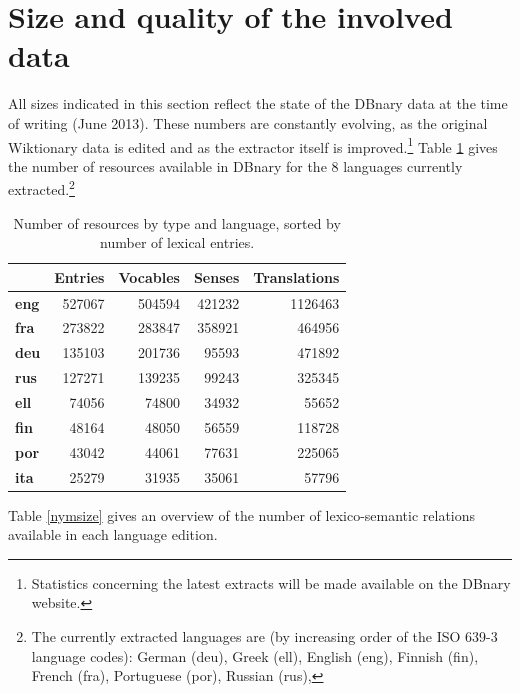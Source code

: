 \documentclass[sw]{iosart2c}
\begin{document}
\section{Size and quality of the involved data}

All sizes indicated in this section reflect the state of the DBnary data at the time of writing (June 2013). These numbers are constantly evolving, as the original Wiktionary data is edited and as the extractor itself is improved.\footnote{Statistics concerning the latest extracts will be made available on the DBnary website.}
 Table \ref{globalsize} gives the number of resources available in DBnary for the 8 languages currently extracted.\footnote{The currently extracted languages are (by increasing order of the ISO 639-3 language codes):
German (deu),
Greek (ell),
English (eng),
Finnish (fin),
French (fra),
Portuguese (por),
Russian (rus),
}

\begin{table}[htb]
\begin{tabular}{lrrrr}
 & \textbf{Entries} & \textbf{Vocables} & \textbf{Senses} & \textbf{Translations}\\
 \hline
\textbf{eng} & 527067 & 504594 & 421232 & 1126463 \\
\textbf{fra} & 273822 & 283847 & 358921 & 464956 \\
\textbf{deu} & 135103 & 201736 & 95593 & 471892 \\
\textbf{rus} & 127271 & 139235 & 99243 & 325345 \\
\textbf{ell} & 74056 & 74800 & 34932 & 55652 \\
\textbf{fin} & 48164 & 48050 & 56559 & 118728 \\
\textbf{por} & 43042 & 44061 & 77631 & 225065 \\
\textbf{ita} & 25279 & 31935 & 35061 & 57796 \\
\end{tabular}
\caption{Number of resources by type and language, sorted by number of lexical entries.}\label{globalsize}
\end{table}



Table \ref{nymsize} gives an overview of the number of lexico-semantic relations available in each language edition.
\end{document}
